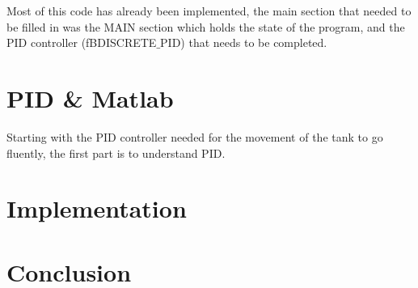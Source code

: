 \documentclass[11pt]{essayStyle} %
\begin{document}
Most of this code has already been implemented, the main section that needed to be filled in was the MAIN section which holds the state of the program, and the PID controller (fBDISCRETE$\_$PID) that needs to be completed.


\section{PID \& Matlab}
Starting with the PID controller needed for the movement of the tank to go fluently, the first part is to understand PID.


\section{Implementation}


\section{Conclusion}






\end{document}
